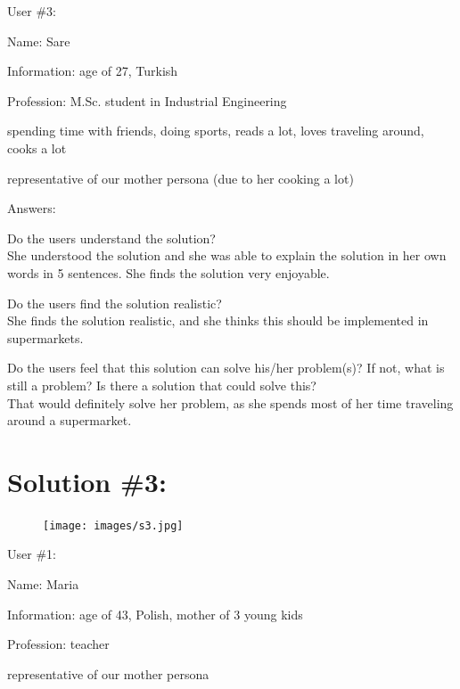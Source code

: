 \documentclass[a4paper,10pt,oneside]{scrreprt}
\begin{document}
User \#3:
\begin{compactitem}
	\item Name: Sare
	\item Information: age of 27, Turkish
	\item Profession: M.Sc. student in Industrial Engineering
	\item spending time with friends, doing sports, reads a lot, loves traveling around, cooks a lot  
	\item representative of our mother persona (due to her cooking a lot)
\end{compactitem}
\bigskip

Answers:
\begin{compactitem}
	\item Do the users understand the solution?\\
	She understood the solution and she was able to explain the solution in her own words in 5 sentences. She finds the solution very enjoyable.\\
	
	
	\item Do the users find the solution realistic?\\
	She finds the solution realistic, and she thinks this should be implemented in supermarkets.\\
	
	\item Do the users feel that this solution can solve his/her problem(s)? If not, what is still
	a problem? Is there a solution that could solve this?\\
	That would definitely solve her problem, as she spends most of her time traveling around a supermarket.\\
\end{compactitem}
\bigskip



\clearpage
\section{Solution \#3:}


\begin{figure}[H]
	\centering
	\texttt{[image: images/s3.jpg]}
\end{figure}


User \#1:
\begin{compactitem}
	\item Name: Maria
	\item Information: age of 43, Polish, mother of 3 young kids
	\item Profession: teacher
	\item representative of our mother persona
\end{compactitem}
\bigskip
\end{document}
